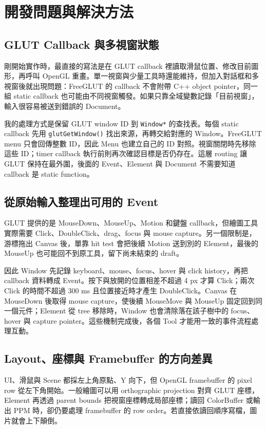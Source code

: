 \section{開發問題與解決方法}

\subsection{GLUT Callback 與多視窗狀態}

剛開始實作時，最直接的寫法是在 GLUT callback 裡讀取滑鼠位置、修改目前圖形，再呼叫 OpenGL 重畫。單一視窗與少量工具時還能維持，但加入對話框和多視窗後就出現問題：FreeGLUT 的 callback 不會附帶 C++ object pointer，同一組 static callback 也可能由不同視窗觸發。如果只靠全域變數記錄「目前視窗」，輸入很容易被送到錯誤的 Document。

我的處理方式是保留 GLUT window ID 到 \lstinline|Window*| 的查找表。每個 static callback 先用 \lstinline|glutGetWindow()| 找出來源，再轉交給對應的 Window。FreeGLUT menu 只會回傳整數 ID，因此 Menu 也建立自己的 ID 對照。視窗關閉時先移除這些 ID；timer callback 執行前則再次確認目標是否仍存在。這層 routing 讓 GLUT 保持在最外圍，後面的 Event、Element 與 Document 不需要知道 callback 是 static function。

\subsection{從原始輸入整理出可用的 Event}

GLUT 提供的是 MouseDown、MouseUp、Motion 和鍵盤 callback，但繪圖工具實際需要 Click、DoubleClick、drag、focus 與 mouse capture。另一個限制是，游標拖出 Canvas 後，單靠 hit test 會把後續 Motion 送到別的 Element，最後的 MouseUp 也可能回不到原工具，留下尚未結束的 draft。

因此 Window 先記錄 keyboard、mouse、focus、hover 與 click history，再把 callback 資料轉成 Event。按下與放開的位置相差不超過 4 px 才算 Click；兩次 Click 的時間不超過 300 ms 且位置接近時才產生 DoubleClick。Canvas 在 MouseDown 後取得 mouse capture，使後續 MouseMove 與 MouseUp 固定回到同一個元件；Element 從 tree 移除時，Window 也會清除落在該子樹中的 focus、hover 與 capture pointer。這些機制完成後，各個 Tool 才能用一致的事件流程處理互動。

\subsection{Layout、座標與 Framebuffer 的方向差異}

UI、滑鼠與 Scene 都採左上角原點、Y 向下，但 OpenGL framebuffer 的 pixel row 從左下角開始。一般繪圖可以用 orthographic projection 對齊 GLUT 座標，Element 再透過 parent bounds 把視窗座標轉成局部座標；讀回 ColorBuffer 或輸出 PPM 時，卻仍要處理 framebuffer 的 row order。若直接依讀回順序寫檔，圖片就會上下顛倒。

